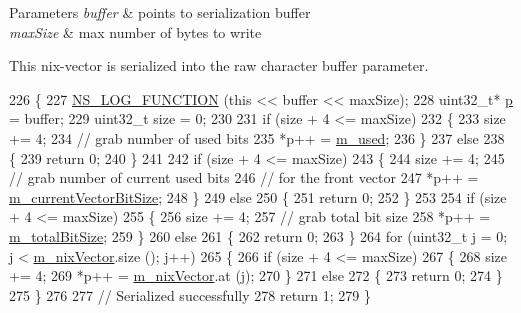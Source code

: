 \begin{DoxyParams}{Parameters}
{\em buffer} & points to serialization buffer\\
\hline
{\em max\+Size} & max number of bytes to write\\
\hline
\end{DoxyParams}
This nix-\/vector is serialized into the raw character buffer parameter. 
\begin{DoxyCode}
226 \{
227   \hyperlink{log-macros-disabled_8h_a90b90d5bad1f39cb1b64923ea94c0761}{NS\_LOG\_FUNCTION} (\textcolor{keyword}{this} << buffer << maxSize);
228   uint32\_t* \hyperlink{lte__link__budget_8m_ac9de518908a968428863f829398a4e62}{p} = buffer;
229   uint32\_t size = 0;
230 
231   \textcolor{keywordflow}{if} (size + 4 <= maxSize)
232     \{
233       size += 4;
234       \textcolor{comment}{// grab number of used bits}
235       *p++ = \hyperlink{classns3_1_1NixVector_a220076d3ab9a6ac07bfaee00360f1b18}{m\_used};
236     \}
237   \textcolor{keywordflow}{else}
238     \{
239       \textcolor{keywordflow}{return} 0;
240     \}
241 
242   \textcolor{keywordflow}{if} (size + 4 <= maxSize)
243     \{
244       size += 4;
245       \textcolor{comment}{// grab number of current used bits}
246       \textcolor{comment}{// for the front vector}
247       *p++ = \hyperlink{classns3_1_1NixVector_ad2514d7b869b341fbe23f5cd54d92f58}{m\_currentVectorBitSize};
248     \}
249   \textcolor{keywordflow}{else}
250     \{
251       \textcolor{keywordflow}{return} 0;
252     \}
253 
254   \textcolor{keywordflow}{if} (size + 4 <= maxSize)
255     \{
256       size += 4;
257       \textcolor{comment}{// grab total bit size}
258       *p++ = \hyperlink{classns3_1_1NixVector_a7a49e3aa07e9d0d45fd509dc5f95857a}{m\_totalBitSize};
259     \}
260   \textcolor{keywordflow}{else} 
261     \{
262       \textcolor{keywordflow}{return} 0;
263     \}
264   \textcolor{keywordflow}{for} (uint32\_t j = 0; j < \hyperlink{classns3_1_1NixVector_a8e3d193156da514255bb033ceb8500df}{m\_nixVector}.size (); j++)
265     \{
266       \textcolor{keywordflow}{if} (size + 4 <= maxSize)
267         \{
268           size += 4;
269           *p++ = \hyperlink{classns3_1_1NixVector_a8e3d193156da514255bb033ceb8500df}{m\_nixVector}.at (j);
270         \}
271       \textcolor{keywordflow}{else}
272         \{
273           \textcolor{keywordflow}{return} 0;
274         \}
275     \}
276 
277   \textcolor{comment}{// Serialized successfully}
278   \textcolor{keywordflow}{return} 1;
279 \}
\end{DoxyCode}


